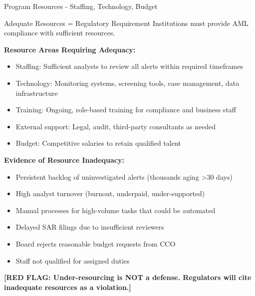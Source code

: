 \documentclass[11pt,a4paper]{beamer}
\newcommand{\redflag}[1]{\textcolor{red!80!black}{\textbf{[RED FLAG: #1]}}}
\begin{document}
	\begin{frame}{Program Resources - Staffing, Technology, Budget}
		\begin{block}{Adequate Resources = Regulatory Requirement}
			Institutions must provide AML compliance with sufficient resources.
		\end{block}
		\textbf{Resource Areas Requiring Adequacy:}
		\begin{itemize}
			\item Staffing: Sufficient analysts to review all alerts within required timeframes
			\item Technology: Monitoring systems, screening tools, case management, data infrastructure
			\item Training: Ongoing, role-based training for compliance and business staff
			\item External support: Legal, audit, third-party consultants as needed
			\item Budget: Competitive salaries to retain qualified talent
		\end{itemize}
		\textbf{Evidence of Resource Inadequacy:}
		\begin{itemize}
			\item Persistent backlog of uninvestigated alerts (thousands aging >30 days)
			\item High analyst turnover (burnout, underpaid, under-supported)
			\item Manual processes for high-volume tasks that could be automated
			\item Delayed SAR filings due to insufficient reviewers
			\item Board rejects reasonable budget requests from CCO
			\item Staff not qualified for assigned duties
		\end{itemize}
		\redflag{Under-resourcing is NOT a defense. Regulators will cite inadequate resources as a violation.}
	\end{frame}
	
	
\end{document}
